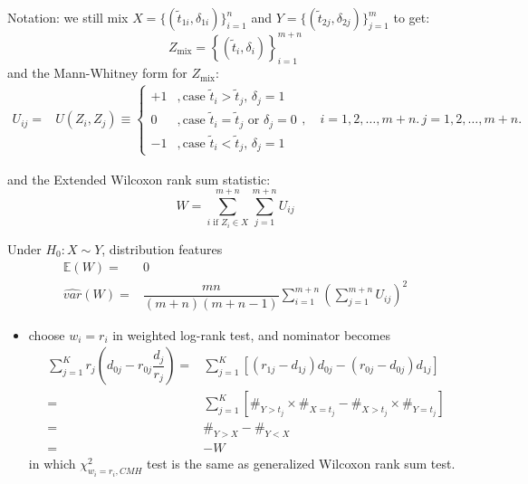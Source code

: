 \begin{itemize}[topsep=2pt,itemsep=0pt]
    Notation: we still mix $ X=\{(\tilde{t}_{1i},\delta _{1i})\}_{i=1}^n $ and $ Y=\{(\tilde{t}_{2j},\delta _{2j})\}_{j=1}^m $ to get:
    \begin{equation}
        Z_\mathrm{mix}=\left\{ (\tilde{t}_i,\delta _i) \right\}_{i=1}^{m+n}  
    \end{equation}
    and the Mann-Whitney form for $ Z_\mathrm{mix}  $:
    \begin{align}
        U_{ij}=&U(Z_i,Z_j)  \equiv\begin{cases}
            +1&,\text{case } \tilde{t}_i>\tilde{t}_j,\, \delta _j=1\\
            0&,\text{case }  \tilde{t}_i=\tilde{t}_j \text{ or } \delta _j=0\\
            -1&,\text{case } \tilde{t}_i<\tilde{t}_j,\, \delta _j=1
        \end{cases},\quad i=1,2,\ldots ,m+n.\, j=1,2,\ldots ,m+n.
    \end{align}
         
    and the Extended Wilcoxon rank sum statistic:
    \begin{equation}
         W=\sum_{i\text{ if }Z_i\in X}^{m+n}\sum_{j=1}^{m+n}U_{ij}
    \end{equation}

    Under $ H_0: X\sim Y $, distribution features
    \begin{align}
        \mathbb{E}\left( W \right) =&0\\
        \hat{var}(W)=&\dfrac{mn}{(m+n)(m+n-1)}\sum_{i=1}^{m+n}\left(\sum_{j=1}^{m+n}U_{ij}\right)^2
    \end{align}

    \begin{itemize}[topsep=2pt,itemsep=0pt]
        \item choose $ w_i=r_i $ in weighted log-rank test, and nominator becomes
        \begin{align}
            \sum_{j=1}^Kr_j(d_{0j}-r_{0j}\dfrac{d_j}{r_j})=&\sum_{j=1}^K\left[ (r_{1j}-d_{1j})d_{0j}-(r_{0j}-d_{0j})d_{1j} \right]\\
            =&\sum_{j=1}^K\left[ \#_{Y>t_j}\times \#_{X=t_j}-\#_{X>t_j}\times \#_{Y=t_j}  \right]\\
            =&\#_{Y>X}-\#_{Y<X}\\
            =&-W
        \end{align}
        in which $ \chi^2_{w_i=r_i,CMH} $ test is the same as generalized Wilcoxon rank sum test.
        
        
    \end{itemize}
    
        
\end{itemize}

